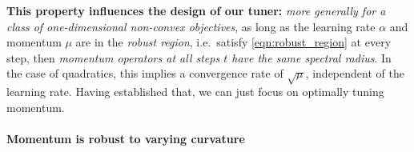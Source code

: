 \documentclass{article}
\begin{document}
{\bf This property influences the design of our tuner:}
\emph{more generally for a class of one-dimensional non-convex objectives},
as long as the learning rate $\alpha$ and momentum $\mu$ are in the {\em robust region}, i.e.\ satisfy \eqref{eqn:robust_region} at every step, then
{\em momentum operators at all steps $t$ have the same spectral radius}.
In the case of quadratics, this implies a convergence rate of $\sqrt{\mu}$, independent of the learning rate.
Having established that, we can just focus on optimally tuning momentum.


\paragraph{Momentum is robust to varying curvature}
\label{sec:curvature_robustness}
\end{document}
